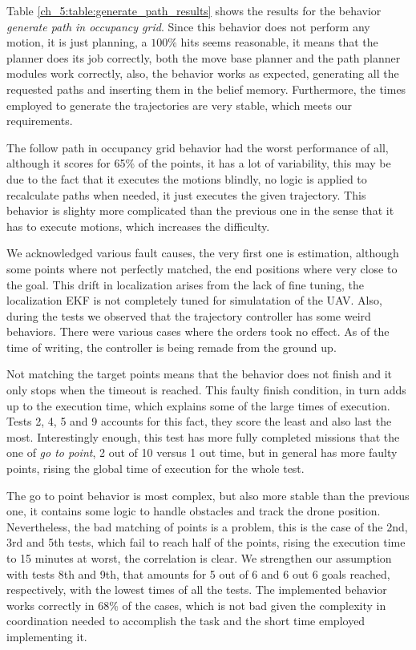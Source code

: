   

  Table \ref{ch_5:table:generate_path_results} shows the results for the behavior \textit{generate path in occupancy grid}. Since this behavior does not perform any motion, it is just planning, a $100\%$ hits seems reasonable, it means that the planner does its job correctly, both the move base planner and the path planner modules work correctly, also, the behavior works as expected, generating all the requested paths and inserting them in the belief memory. Furthermore, the times employed to generate the trajectories are very stable, which meets our requirements. 

  

  The follow path in occupancy grid behavior had the worst performance of all, although it scores for 65\% of the points, it has a lot of variability, this may be due to the fact that it executes the motions blindly, no logic is applied to recalculate paths when needed, it just executes the given trajectory. This behavior is slighty more complicated than the previous one in the sense that it has to execute motions, which increases the difficulty.

  We acknowledged various fault causes, the very first one is estimation, although some points where not perfectly matched, the end positions where very close to the goal. This drift in localization arises from the lack of fine tuning, the localization EKF is not completely tuned for simulatation of the UAV. Also, during the tests we observed that the trajectory controller has some weird behaviors. There were various cases where the orders took no effect. As of the time of writing, the controller is being remade from the ground up.

  Not matching the target points means that the behavior does not finish and it only stops when the timeout is reached. This faulty finish condition, in turn adds up to the execution time, which explains some of the large times of execution. Tests 2, 4, 5 and 9 accounts for this fact, they score the least and also last the most. Interestingly enough, this test has more fully completed missions that the one of \textit{go to point}, 2 out of 10 versus 1 out time, but in general has more faulty points, rising the global time of execution for the whole test.

  

  The go to point behavior is most complex, but also more stable than the previous one, it contains some logic to handle obstacles and track the drone position. Nevertheless, the bad matching of points is a problem, this is the case of the 2nd, 3rd and 5th tests, which fail to reach half of the points, rising the execution time to 15 minutes at worst, the correlation is clear. We strengthen our assumption with tests 8th and 9th, that amounts for 5 out of 6 and 6 out 6 goals reached, respectively, with the lowest times of all the tests. The implemented behavior works correctly in 68\% of the cases, which is not bad given the complexity in coordination needed to accomplish the task and the short time employed implementing it.

